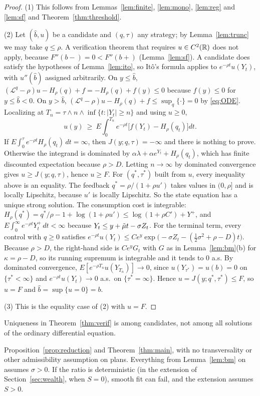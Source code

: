 \begin{proof}
(1) This follows from Lemmas~\ref{lem:finite}, \ref{lem:mono}, \ref{lem:reg} and \ref{lem:sf} and Theorem~\ref{thm:threshold}.

(2) Let $(\hat b,u)$ be a candidate and $(q,\tau)$ any strategy; by Lemma~\ref{lem:trunc} we may take $q\le\rho$. A verification theorem that requires $u\in C^2(\mathbb{R})$ does not apply, because $F''(b-)=0<F''(b+)$ (Lemma~\ref{lem:sf}). A candidate does satisfy the hypotheses of Lemma~\ref{lem:ito}, so It\^o's formula applies to $e^{-\rho t}u(Y_t)$, with $u''(\hat b)$ assigned arbitrarily. On $y\le\hat b$, $(\mathcal L^q-\rho)u-H_\rho(q)+f=-H_\rho(q)+f(y)\le0$ because $f(y)\le0$ for $y\le\hat b<0$. On $y>\hat b$, $(\mathcal L^q-\rho)u-H_\rho(q)+f\le\sup_q\{\cdot\}=0$ by \eqref{eq:ODE}. Localizing at $T_n=\tau\wedge n\wedge\inf\{t:|Y_t|\ge n\}$ and using $u\ge0$,
\[
u(y)\ \ge\ E\int_0^{T_n}e^{-\rho t}\big[f(Y_t)-H_\rho(q_t)\big]dt .
\]
If $E\int_0^\tau e^{-\rho t}H_\rho(q_t)\,dt=\infty$, then $J(y;q,\tau)=-\infty$ and there is nothing to prove. Otherwise the integrand is dominated by $\alpha\lambda+\alpha e^{Y_t}+H_\rho(q_t)$, which has finite discounted expectation because $\rho>D$. Letting $n\to\infty$ by dominated convergence gives $u\ge J(y;q,\tau)$, hence $u\ge F$. For $(q^*,\tau^*)$ built from $u$, every inequality above is an equality. The feedback $q^*=\rho/(1+\rho u')$ takes values in $(0,\rho]$ and is locally Lipschitz, because $u'$ is locally Lipschitz. So the state equation has a unique strong solution. The consumption cost is integrable: $H_\rho(q^*)=q^*/\rho-1+\log(1+\rho u')\le\log(1+\rho C')+Y^+$, and $E\int_0^\infty e^{-\rho t}Y_t^+\,dt<\infty$ because $Y_t\le y+\tilde\mu t-\sigma Z_t$. For the terminal term, every control with $q\ge0$ satisfies $e^{-\rho t}u(Y_t)\le Ce^{y}\exp\!\big(-\sigma Z_t-(\tfrac12\sigma^2+\rho-D)t\big)$. Because $\rho>D$, the right-hand side is $Ce^yG_t$ with $G$ as in Lemma~\ref{lem:bm}(b) for $\kappa=\rho-D$, so its running supremum is integrable and it tends to $0$ a.s. By dominated convergence, $E[e^{-\rho T_n}u(Y_{T_n})]\to0$, since $u(Y_{\tau^*})=u(b)=0$ on $\{\tau^*<\infty\}$ and $e^{-\rho t}u(Y_t)\to0$ a.s.\ on $\{\tau^*=\infty\}$. Hence $u=J(y;q^*,\tau^*)\le F$, so $u=F$ and $\hat b=\sup\{u=0\}=b$.

(3) This is the equality case of (2) with $u=F$.
\end{proof}

\begin{aremark}
Uniqueness in Theorem~\ref{thm:verif} is among candidates, not among all solutions of the ordinary differential equation.
\end{aremark}

\begin{aremark}
Proposition~\ref{prop:reduction} and Theorem~\ref{thm:main}, with no transversality or other admissibility assumption on plans. Everything from Lemma~\ref{lem:bm} on assumes $\sigma>0$. If the ratio is deterministic (in the extension of Section~\ref{sec:wealth}, when $S=0$), smooth fit can fail, and the extension assumes $S>0$.
\end{aremark}

